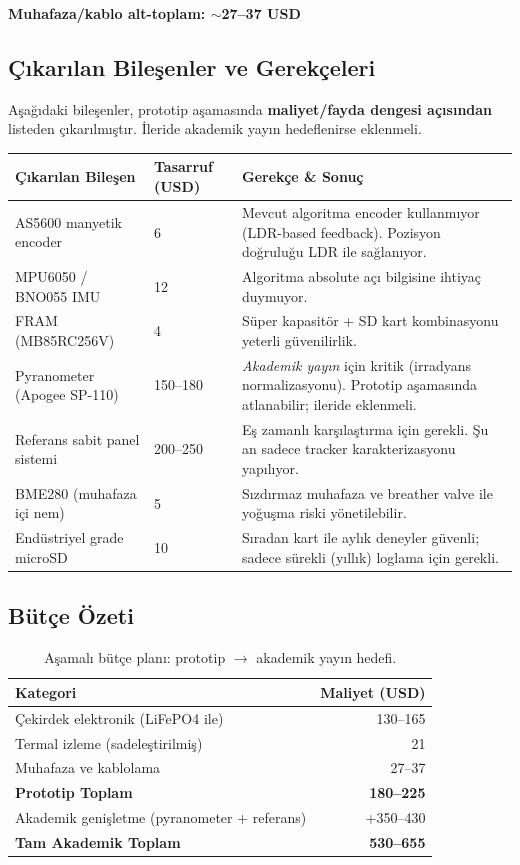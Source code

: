 \documentclass[11pt,a4paper]{article}
\begin{document}
\textbf{Muhafaza/kablo alt-toplam: $\sim$27--37 USD}

\subsection{Çıkarılan Bileşenler ve Gerekçeleri}

Aşağıdaki bileşenler, prototip aşamasında \textbf{maliyet/fayda dengesi açısından} listeden çıkarılmıştır. İleride akademik yayın hedeflenirse eklenmeli.

\begin{longtable}{|p{4cm}|p{2cm}|p{8cm}|}
\hline
\rowcolor{danger!15}
\textbf{Çıkarılan Bileşen} & \textbf{Tasarruf (USD)} & \textbf{Gerekçe \& Sonuç} \\
\hline
\endhead

AS5600 manyetik encoder & 6 & Mevcut algoritma encoder kullanmıyor (LDR-based feedback). Pozisyon doğruluğu LDR ile sağlanıyor. \\
\hline
MPU6050 / BNO055 IMU & 12 & Algoritma absolute açı bilgisine ihtiyaç duymuyor. \\
\hline
FRAM (MB85RC256V) & 4 & Süper kapasitör + SD kart kombinasyonu yeterli güvenilirlik. \\
\hline
Pyranometer (Apogee SP-110) & 150--180 & \textit{Akademik yayın} için kritik (irradyans normalizasyonu). Prototip aşamasında atlanabilir; ileride eklenmeli. \\
\hline
Referans sabit panel sistemi & 200--250 & Eş zamanlı karşılaştırma için gerekli. Şu an sadece tracker karakterizasyonu yapılıyor. \\
\hline
BME280 (muhafaza içi nem) & 5 & Sızdırmaz muhafaza ve breather valve ile yoğuşma riski yönetilebilir. \\
\hline
Endüstriyel grade microSD & 10 & Sıradan kart ile aylık deneyler güvenli; sadece sürekli (yıllık) loglama için gerekli. \\
\hline
\end{longtable}

\subsection{Bütçe Özeti}

\begin{table}[h]
\centering
\renewcommand{\arraystretch}{1.3}
\begin{tabular}{|l|r|}
\hline
\rowcolor{primary!15}
\textbf{Kategori} & \textbf{Maliyet (USD)} \\
\hline
Çekirdek elektronik (LiFePO4 ile) & 130--165 \\
\hline
Termal izleme (sadeleştirilmiş) & 21 \\
\hline
Muhafaza ve kablolama & 27--37 \\
\hline
\textbf{Prototip Toplam} & \textbf{180--225} \\
\hline
\hline
Akademik genişletme (pyranometer + referans) & +350--430 \\
\hline
\textbf{Tam Akademik Toplam} & \textbf{530--655} \\
\hline
\end{tabular}
\caption{Aşamalı bütçe planı: prototip $\rightarrow$ akademik yayın hedefi.}
\end{table}
\end{document}
